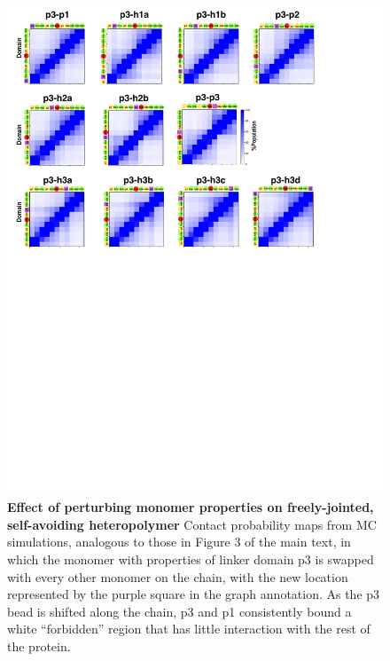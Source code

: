 \documentclass[journal=jacsat,manuscript=article]{achemso}
\begin{document}
 \begin{figure}[!ht]
\includegraphics[scale=0.5,width=\textwidth,trim={0 0cm 0 0cm},clip]{../figures/S4.pdf}
\caption{{\bf Effect of perturbing monomer properties on freely-jointed, self-avoiding heteropolymer} Contact probability maps from MC simulations, analogous to those in Figure 3 of the main text, in which the monomer with properties of linker domain p3 is swapped with every other monomer on the chain, with the new location represented by the purple square in the graph annotation.  As the p3 bead is shifted along the chain, p3 and p1 consistently bound a white ``forbidden'' region that has little interaction with the rest of the protein. }
\label{S4} 
\end{figure}
\end{document}
